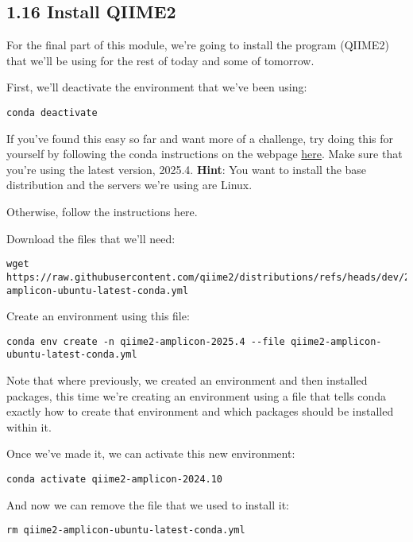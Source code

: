 \documentclass[
]{book}
\begin{document}
\subsection{1.16 Install QIIME2}\label{install-qiime2}

For the final part of this module, we're going to install the program (QIIME2) that we'll be using for the rest of today and some of tomorrow.

First, we'll deactivate the environment that we've been using:

\begin{verbatim}
conda deactivate
\end{verbatim}

If you've found this easy so far and want more of a challenge, try doing this for yourself by following the conda instructions on the webpage \href{https://library.qiime2.org/quickstart/amplicon\#using-conda}{here}. Make sure that you're using the latest version, 2025.4.
\textbf{Hint}: You want to install the base distribution and the servers we're using are Linux.

Otherwise, follow the instructions here.

Download the files that we'll need:

\begin{verbatim}
wget https://raw.githubusercontent.com/qiime2/distributions/refs/heads/dev/2025.4/amplicon/released/qiime2-amplicon-ubuntu-latest-conda.yml
\end{verbatim}

Create an environment using this file:

\begin{verbatim}
conda env create -n qiime2-amplicon-2025.4 --file qiime2-amplicon-ubuntu-latest-conda.yml
\end{verbatim}

Note that where previously, we created an environment and then installed packages, this time we're creating an environment using a file that tells conda exactly how to create that environment and which packages should be installed within it.

Once we've made it, we can activate this new environment:

\begin{verbatim}
conda activate qiime2-amplicon-2024.10
\end{verbatim}

And now we can remove the file that we used to install it:

\begin{verbatim}
rm qiime2-amplicon-ubuntu-latest-conda.yml
\end{verbatim}
\end{document}
